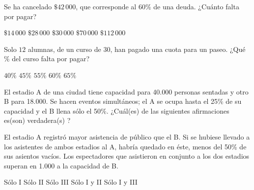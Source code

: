 \documentclass[]{srs}
\begin{document}
\begin{preguntas}
\pregunta Se ha cancelado $\$42\,000$, que corresponde al $60\%$ de una deuda. ¿Cuánto falta por pagar?
\begin{vertical}
\alternativa $\$14\,000$
\alternativa $\$28\,000$
\alternativa $\$30\,000$
\alternativa $\$70\,000$
\alternativa $\$112\,000$
\end{vertical}



\pregunta Solo $12$ alumnas, de un curso de $30$, han pagado una cuota para un paseo. ¿Qué $\%$ del curso falta por pagar?
\begin{vertical}
\alternativa $40\%$
\alternativa $45\%$
\alternativa $55\%$
\alternativa $60\%$
\alternativa $65\%$
\end{vertical}

\pregunta El estadio A de una ciudad tiene capacidad para 40.000 personas sentadas y otro B para 18.000. Se hacen eventos simultáneos; el A se ocupa hasta el 25\% de su capacidad y el B llena sólo el 50\%. ¿Cuál(es) de las siguientes afirmaciones es(son) verdadera(s) ?
\begin{verticali}
\alternativa El estadio A registró mayor asistencia de público que el B.
\alternativa Si se hubiese llevado a los asistentes de ambos estadios al A, habría quedado en éste, menos del 50\% de sus asientos vacíos.
\alternativa Los espectadores que asistieron en conjunto a los dos estadios superan en 1.000 a la capacidad de B.
\end{verticali}
\begin{vertical}
\alternativa Sólo I
\alternativa Sólo II
\alternativa Sólo III
\alternativa Sólo I y II
\alternativa Sólo I y III
\end{vertical}

\end{preguntas}
\end{document}
